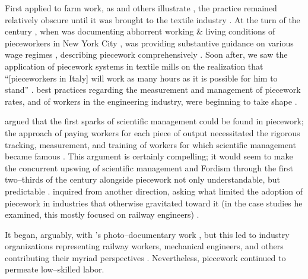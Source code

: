 \documentclass[trackingWork]{subfiles}
\begin{document}
First applied to farm work, as
\citeauthor{hughRaynbirdTaskWork} and others illustrate%
, the practice remained relatively obscure until
it was brought to the textile industry
\cite{hughRaynbirdTaskWork}.
At the turn of the  century%
, when \citeauthor{riisOtherSideLives} was documenting abhorrent working \& living conditions of pieceworkers in New York City%
, \citeauthor{norton1900textile} was providing substantive guidance on various wage regimes%
, describing piecework comprehensively
\cite{riisOtherSideLives,norton1900textile}.
Soon after,
we saw the application of piecework systems in textile mills on the realization that
``[pieceworkers in Italy] will work as many hours as it is possible for him to stand''
\cite{clark1908cotton}.
best practices regarding the measurement and management of
piecework rates, and of workers in the engineering industry,
were beginning to take shape
\cite{burton1899commercial}.

\citeauthor{10.2307/23702539} argued that the first sparks of scientific management
could be found in piecework;
the approach of paying workers for each piece of output necessitated
the rigorous tracking, measurement, and training of workers
for which scientific management became famous
\cite{10.2307/23702539}.
This argument is certainly compelling;
it would seem to make the concurrent upswing of
scientific management and Fordism
through the first two--thirds of the  century
alongside piecework not only understandable, but predictable
\cite{hart2013rise}.
\citeauthor{Brown01041990} inquired from another direction, asking
what limited the adoption of piecework in industries that otherwise gravitated toward it
(in the case studies he examined, this mostly focused on railway engineers)
\cite{Brown01041990}.


It began, arguably, with \citeauthor{riisOtherSideLives}'s photo--documentary work%
, but this led to industry organizations representing
railway workers, mechanical engineers, and others contributing their myriad perspectives
\cite{american1921problem,richards1904anything,riisOtherSideLives}.
Nevertheless, piecework continued to permeate low--skilled labor.
\end{document}

